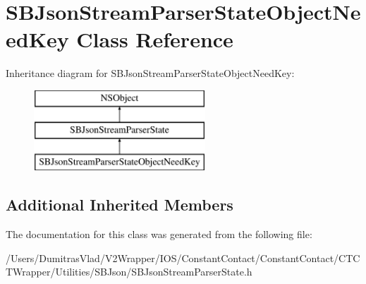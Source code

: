 \hypertarget{interface_s_b_json_stream_parser_state_object_need_key}{\section{S\-B\-Json\-Stream\-Parser\-State\-Object\-Need\-Key Class Reference}
\label{interface_s_b_json_stream_parser_state_object_need_key}
}
Inheritance diagram for S\-B\-Json\-Stream\-Parser\-State\-Object\-Need\-Key\-:\begin{figure}[H]
\begin{center}
\leavevmode
\includegraphics[height=3.000000cm]{interface_s_b_json_stream_parser_state_object_need_key}
\end{center}
\end{figure}
\subsection*{Additional Inherited Members}


The documentation for this class was generated from the following file\-:\begin{DoxyCompactItemize}
\item 
/\-Users/\-Dumitras\-Vlad/\-V2\-Wrapper/\-I\-O\-S/\-Constant\-Contact/\-Constant\-Contact/\-C\-T\-C\-T\-Wrapper/\-Utilities/\-S\-B\-Json/S\-B\-Json\-Stream\-Parser\-State.\-h\end{DoxyCompactItemize}
